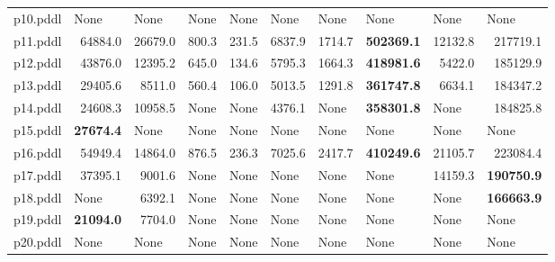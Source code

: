 \documentclass{article}
\begin{document}
\begin{tabular}{@{}lrrrrrrrrr@{}}
p10.pddl & \multicolumn{1}{|l|}{None} & \multicolumn{1}{|l|}{None} & \multicolumn{1}{|l|}{None} & \multicolumn{1}{|l|}{None} & \multicolumn{1}{|l|}{None} & \multicolumn{1}{|l|}{None} & \multicolumn{1}{|l|}{None} & \multicolumn{1}{|l|}{None} & \multicolumn{1}{|l|}{None} \\
p11.pddl & 64884.0 & 26679.0 & 800.3 & 231.5 & 6837.9 & 1714.7 & \textbf{502369.1} & 12132.8 & 217719.1 \\
p12.pddl & 43876.0 & 12395.2 & 645.0 & 134.6 & 5795.3 & 1664.3 & \textbf{418981.6} & 5422.0 & 185129.9 \\
p13.pddl & 29405.6 & 8511.0 & 560.4 & 106.0 & 5013.5 & 1291.8 & \textbf{361747.8} & 6634.1 & 184347.2 \\
p14.pddl & 24608.3 & 10958.5 & \multicolumn{1}{|l|}{None} & \multicolumn{1}{|l|}{None} & 4376.1 & \multicolumn{1}{|l|}{None} & \textbf{358301.8} & \multicolumn{1}{|l|}{None} & 184825.8 \\
p15.pddl & \textbf{27674.4} & \multicolumn{1}{|l|}{None} & \multicolumn{1}{|l|}{None} & \multicolumn{1}{|l|}{None} & \multicolumn{1}{|l|}{None} & \multicolumn{1}{|l|}{None} & \multicolumn{1}{|l|}{None} & \multicolumn{1}{|l|}{None} & \multicolumn{1}{|l|}{None} \\
p16.pddl & 54949.4 & 14864.0 & 876.5 & 236.3 & 7025.6 & 2417.7 & \textbf{410249.6} & 21105.7 & 223084.4 \\
p17.pddl & 37395.1 & 9001.6 & \multicolumn{1}{|l|}{None} & \multicolumn{1}{|l|}{None} & \multicolumn{1}{|l|}{None} & \multicolumn{1}{|l|}{None} & \multicolumn{1}{|l|}{None} & 14159.3 & \textbf{190750.9} \\
p18.pddl & \multicolumn{1}{|l|}{None} & 6392.1 & \multicolumn{1}{|l|}{None} & \multicolumn{1}{|l|}{None} & \multicolumn{1}{|l|}{None} & \multicolumn{1}{|l|}{None} & \multicolumn{1}{|l|}{None} & \multicolumn{1}{|l|}{None} & \textbf{166663.9} \\
p19.pddl & \textbf{21094.0} & 7704.0 & \multicolumn{1}{|l|}{None} & \multicolumn{1}{|l|}{None} & \multicolumn{1}{|l|}{None} & \multicolumn{1}{|l|}{None} & \multicolumn{1}{|l|}{None} & \multicolumn{1}{|l|}{None} & \multicolumn{1}{|l|}{None} \\
p20.pddl & \multicolumn{1}{|l|}{None} & \multicolumn{1}{|l|}{None} & \multicolumn{1}{|l|}{None} & \multicolumn{1}{|l|}{None} & \multicolumn{1}{|l|}{None} & \multicolumn{1}{|l|}{None} & \multicolumn{1}{|l|}{None} & \multicolumn{1}{|l|}{None} & \multicolumn{1}{|l|}{None} \\
\end{tabular}
\end{document}

